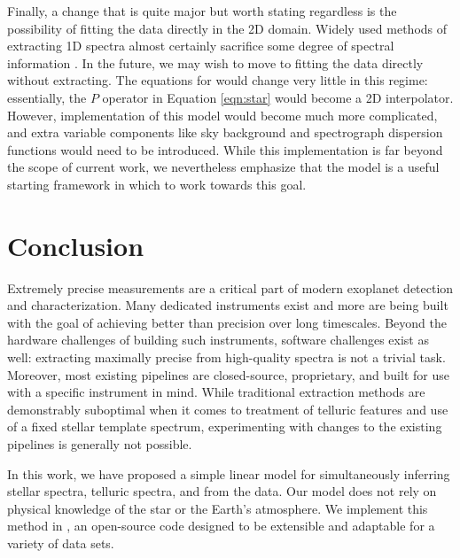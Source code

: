 \documentclass[twocolumn]{aastex62}
\begin{document}
Finally, a change that is quite major but worth stating regardless is the possibility of fitting the data directly in the 2D domain. 
Widely used methods of extracting 1D spectra almost certainly sacrifice some degree of spectral information \citep{Bolton2010}.
In the future, we may wish to move to fitting the data directly without extracting. 
The equations for \wobble would change very little in this regime: essentially, the $P$ operator in Equation \ref{eqn:star} would become a 2D interpolator. 
However, implementation of this model would become much more complicated, and extra variable components like sky background and spectrograph dispersion functions would need to be introduced. 
While this implementation is far beyond the scope of current work, we nevertheless emphasize that the \wobble model is a useful starting framework in which to work towards this goal.

\section{Conclusion}
\label{s:conclusion}

Extremely precise \RV measurements are a critical part of modern exoplanet detection and characterization. 
Many dedicated \EPRV instruments exist and more are being built with the goal of achieving better than \ms precision over long timescales. 
Beyond the hardware challenges of building such instruments, software challenges exist as well: extracting maximally precise \RVs from high-quality spectra is not a trivial task. 
Moreover, most existing \EPRV pipelines are closed-source, proprietary, and built for use with a specific instrument in mind. 
While traditional \RV extraction methods are demonstrably suboptimal when it comes to treatment of telluric features and use of a fixed stellar template spectrum, experimenting with changes to the existing pipelines is generally not possible. 


In this work, we have proposed a simple linear model for simultaneously inferring stellar spectra, telluric spectra, and \RVs from the data. 
Our model does not rely on physical knowledge of the star or the Earth's atmosphere. 
We implement this method in \wobble, an open-source code designed to be extensible and adaptable for a variety of data sets. 
\end{document}
